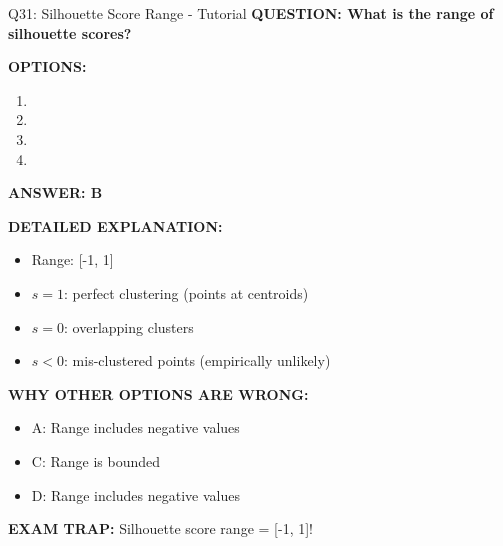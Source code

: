 \documentclass[8pt]{beamer}
\begin{document}
	\begin{frame}{Q31: Silhouette Score Range - Tutorial}
		\fontsize{6.5}{7.5}\selectfont
		\textbf{QUESTION: What is the range of silhouette scores?}
		
		\vspace{0.1cm}
		\textbf{OPTIONS:}
		\begin{enumerate}
			\item [0, 1]
			\item [-1, 1]
			\item [-infinity, infinity]
			\item [0, infinity]
		\end{enumerate}
		
		\vspace{0.1cm}
		\textcolor{myblue}{\textbf{ANSWER: B}}
		
		\vspace{0.1cm}
		\textbf{DETAILED EXPLANATION:}
		\begin{itemize}
			\item Range: [-1, 1]
			\item $s = 1$: perfect clustering (points at centroids)
			\item $s = 0$: overlapping clusters
			\item $s < 0$: mis-clustered points (empirically unlikely)
		\end{itemize}
		
		\vspace{0.1cm}
		\textcolor{myred}{\textbf{WHY OTHER OPTIONS ARE WRONG:}}
		\begin{itemize}
			\item \textcolor{myred}{A:} Range includes negative values
			\item \textcolor{myred}{C:} Range is bounded
			\item \textcolor{myred}{D:} Range includes negative values
		\end{itemize}
		
		\textcolor{myred}{\textbf{EXAM TRAP:}} Silhouette score range = \textcolor{myblue}{[-1, 1]}!
	\end{frame}
	
\end{document}
